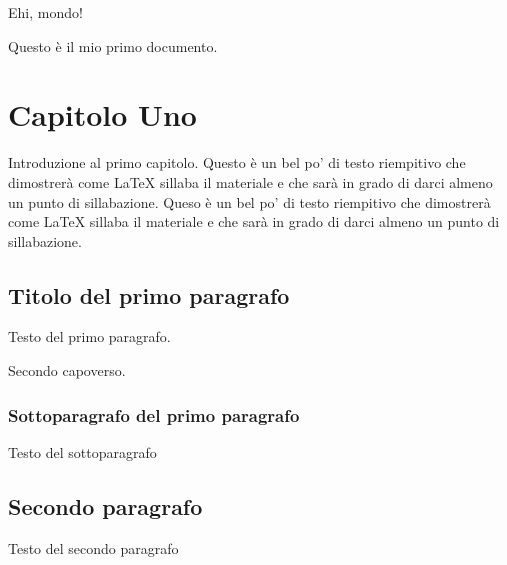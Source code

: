 \documentclass{book}
\begin{document}
Ehi, mondo!

Questo è il mio primo documento.

\chapter{Capitolo Uno}
Introduzione al primo capitolo.
\bigbreak
Questo è un bel po' di testo riempitivo che dimostrerà come LaTeX sillaba 
il materiale e che sarà in grado di darci almeno un punto di sillabazione.
Queso è un bel po' di testo riempitivo che dimostrerà come LaTeX sillaba
il materiale e che sarà in grado di darci almeno un punto di sillabazione.

\section{Titolo del primo paragrafo}
Testo del primo paragrafo.

Secondo capoverso.

\subsection{Sottoparagrafo del primo paragrafo}
Testo del sottoparagrafo

\section{Secondo paragrafo}
Testo del secondo paragrafo
\end{document}
